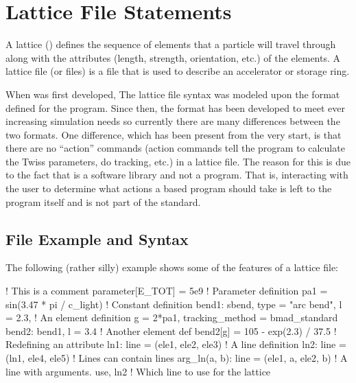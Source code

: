 \chapter{Lattice File Statements}
\label{c:lat.file}

A lattice () defines the sequence of elements that a particle will travel
through along with the attributes (length, strength, orientation, etc.) of the elements.  A lattice
file (or files) is a file that is used to describe an accelerator or storage ring.

When \bmad was first developed, The \bmad lattice file syntax was modeled upon the format defined
for the \mad program\cite{b:maduser}. Since then, the \bmad format has been developed to meet ever
increasing simulation needs so currently there are many differences between the two formats. One
difference, which has been present from the very start, is that there are no ``action'' commands
(action commands tell the program to calculate the Twiss parameters, do tracking, etc.) in a \bmad
lattice file. The reason for this is due to the fact that \bmad is a software library and not a
program. That is, interacting with the user to determine what actions a \bmad based program should
take is left to the program itself and is not part of the \bmad standard.

\section{File Example and Syntax}

The following (rather silly) example shows some of the features of a
\bmad lattice file:
\begin{example}
  ! This is a comment
  parameter[E_TOT] = 5e9                   ! Parameter definition
  pa1 = sin(3.47 * pi / c_light)                 ! Constant definition
  bend1: sbend, type = "arc bend", l = 2.3,      ! An element definition
      g = 2*pa1, tracking_method = bmad_standard
  bend2: bend1, l = 3.4                          ! Another element def
  bend2[g] = 105 - exp(2.3) / 37.5               ! Redefining an attribute
  ln1: line = (ele1, ele2, ele3)                 ! A line definition
  ln2: line = (ln1, ele4, ele5)                  ! Lines can contain lines
  arg_ln(a, b): line = (ele1, a, ele2, b)        ! A line with arguments.
  use, ln2                                       ! Which line to use for the lattice
\end{example}

